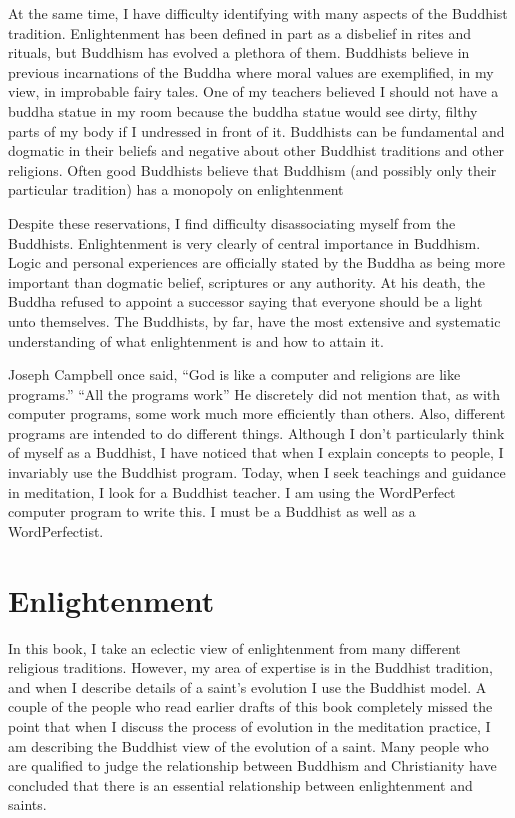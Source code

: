\documentclass[a5paper,10pt,english]{book}
\begin{document}
\sphinxAtStartPar
At the same time, I have difficulty identifying with many aspects of the
Buddhist tradition. Enlightenment has been defined in part as a
disbelief in rites and rituals, but Buddhism has evolved a plethora of
them. Buddhists believe in previous incarnations of the Buddha where
moral values are exemplified, in my view, in improbable fairy tales. One
of my teachers believed I should not have a buddha statue in my room
because the buddha statue would see dirty, filthy parts of my body if I
undressed in front of it. Buddhists can be fundamental and dogmatic in
their beliefs and negative about other Buddhist traditions and other
religions. Often good Buddhists believe that Buddhism (and possibly only
their particular tradition) has a monopoly on enlightenment

\sphinxAtStartPar
Despite these reservations, I find difficulty disassociating myself from
the Buddhists. Enlightenment is very clearly of central importance in
Buddhism. Logic and personal experiences are officially stated by the
Buddha as being more important than dogmatic belief, scriptures or any
authority. At his death, the Buddha refused to appoint a successor
saying that everyone should be a light unto themselves. The Buddhists,
by far, have the most extensive and systematic understanding of what
enlightenment is and how to attain it.

\sphinxAtStartPar
Joseph Campbell once said, “God is like a computer and religions are
like programs.” “All the programs work” He discretely did not mention
that, as with computer programs, some work much more efficiently than
others. Also, different programs are intended to do different things.
Although I don’t particularly think of myself as a Buddhist, I have
noticed that when I explain concepts to people, I invariably use the
Buddhist program. Today, when I seek teachings and guidance in
meditation, I look for a Buddhist teacher. I am using the WordPerfect
computer program to write this. I must be a Buddhist as well as a
WordPerfectist.


\section{Enlightenment}
\label{\detokenize{preface:enlightenment}}
\sphinxAtStartPar
In this book, I take an eclectic view of enlightenment from many
different religious traditions. However, my area of expertise is in the
Buddhist tradition, and when I describe details of a saint’s evolution I
use the Buddhist model. A couple of the people who read earlier drafts
of this book completely missed the point that when I discuss the process
of evolution in the meditation practice, I am describing the Buddhist
view of the evolution of a saint. Many people who are qualified to judge
the relationship between Buddhism and Christianity have concluded that
there is an essential relationship between enlightenment and saints.
\end{document}
